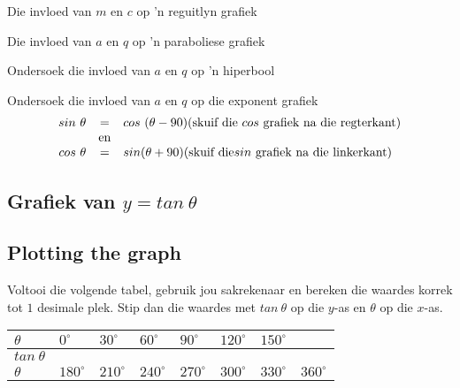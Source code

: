 \begin{Ondersoek}{Die invloed van $m$ en $c$ op 'n reguitlyn grafiek}
\begin{Ondersoek}{Die invloed van $a$ en $q$ op 'n paraboliese grafiek}
\begin{Ondersoek}{Ondersoek die invloed van $a$ en $q$ op 'n hiperbool}
\begin{Ondersoek}{Ondersoek die invloed van $a$ en $q$ op die exponent grafiek}
\nopagebreak\noindent{}
\begin{equation*}
  \begin{array}{ccc}
    \hfill sin~\theta &=& cos~(\theta -90)(\mbox{skuif die } cos\mbox{ grafiek na die regterkant})\hfill \\
    & \mbox{en} & \\
    \hfill cos~\theta &=& sin(\theta +90)(\mbox{skuif die}sin\mbox{ grafiek na die linkerkant})\hfill 
  \end{array}
\end{equation*}

\subsection{Grafiek van $y=tan~\theta $ }
\subsection*{Plotting the graph}
\nopagebreak
Voltooi die volgende tabel, gebruik jou sakrekenaar en bereken die waardes korrek tot $1$ desimale plek. Stip dan
die waardes met $tan~\theta $ op die $y$-as en $\theta $ op die $x$-as.\par 

\setlength\mytablespace{16\tabcolsep}
\addtolength\mytablespace{9\arrayrulewidth}
\setlength\mytablewidth{\linewidth}
\setlength\mytableroom{\mytablewidth}
\addtolength\mytableroom{-\mytablespace}
\setlength\myfixedwidth{0pt}
\setlength\mystarwidth{\mytableroom}
\addtolength\mystarwidth{-\myfixedwidth}
\divide{}

\begin{center}
\label{m39414*id89083}
\noindent

\begin{tabular*}{\mytablewidth}{|p{10\mystarwidth}|p{10\mystarwidth}|p{10\mystarwidth}|p{10\mystarwidth}|p{10\mystarwidth}|p{10\mystarwidth}|p{10\mystarwidth}|p{10\mystarwidth}|}\hline

$\theta $ &
$0^{\circ }$ &
$30^{\circ }$ &
$60^{\circ }$ &
$90^{\circ }$ &
$120^{\circ }$ &
$150^{\circ }$ &

\\ \hline

$tan~\theta $ &
&
&
&
&
&
&

\\ \hline

$\theta $ &
$180^{\circ }$ &
$210^{\circ }$ &
$240^{\circ }$ &
$270^{\circ }$ &
$300^{\circ }$ &
$330^{\circ }$ &
$360^{\circ }$
\\ \hline


\end{tabular*}
\end{center}
\end{Ondersoek}
\end{Ondersoek}
\end{Ondersoek}
\end{Ondersoek}
